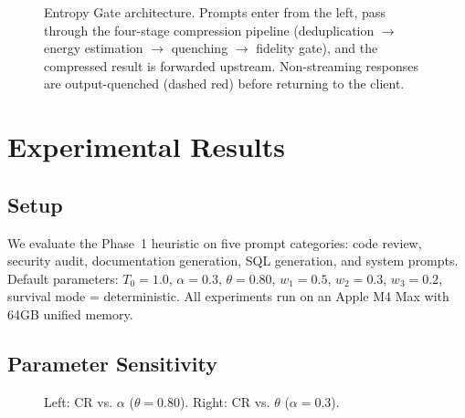 \documentclass[11pt]{article}
\theoremstyle{remark}
\begin{document}
\begin{figure}[H]
\caption{Entropy Gate architecture. Prompts enter from the left, pass through the four-stage compression pipeline (deduplication $\to$ energy estimation $\to$ quenching $\to$ fidelity gate), and the compressed result is forwarded upstream. Non-streaming responses are output-quenched (dashed red) before returning to the client.}
\label{fig:architecture}
\end{figure}

\section{Experimental Results}
\label{sec:evaluation}

\subsection{Setup}

We evaluate the Phase~1 heuristic on five prompt categories: code review,
security audit, documentation generation, SQL generation, and system prompts.
Default parameters: $T_0 = 1.0$, $\alpha = 0.3$, $\theta = 0.80$,
$w_1 = 0.5$, $w_2 = 0.3$, $w_3 = 0.2$, survival mode = deterministic.
All experiments run on an Apple M4 Max with 64GB unified memory.

\subsection{Parameter Sensitivity}

\begin{figure}[H]
\centering
{}
\hfill
{}
\caption{Left: CR vs. $\alpha$ ($\theta = 0.80$). Right: CR vs. $\theta$ ($\alpha = 0.3$).}
\label{fig:param-sweep}
\end{figure}
\end{document}
